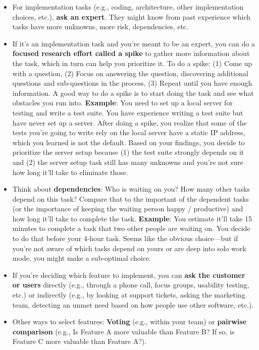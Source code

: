\begin{itemize}
    \item For implementation tasks (e.g., coding, architecture, other implementation choices, etc.), \textbf{ask an expert}. They might know from past experience which tasks have more unknowns, more risk, dependencies, etc.\\
    \item If it's an implementation task and you're meant to be an expert, you can do a \textbf{focused research effort called a spike}\marginpar{\spikeDef} to gather more information about the task, which in turn can help you prioritize it. To do a spike: (1) Come up with a question, (2) Focus on answering the question, discovering additional questions and sub-questions in the process, (3) Repeat until you have enough information. A good way to do a spike is to start doing the task and see what obstacles you run into. \textbf{Example}: You need to set up a local server for testing and write a test suite. You have experience writing a test suite but have never set up a server. After doing a spike, you realize that some of the tests you're going to write rely on the local server have a static IP address, which you learned is not the default. Based on your findings, you decide to prioritize the server setup because (1) the test suite strongly depends on it and (2) the server setup task still has many unknowns and you're not sure how long it'll take to eliminate those. \\
    \item Think about \textbf{dependencies}: Who is waiting on you? How many other tasks depend on this task? Compare that to the important of the dependent tasks (or the importance of keeping the waiting person happy / productive) and how long it'll take to complete the task. \textbf{Example}: You estimate it'll take 15 minutes to complete a task that two other people are waiting on. You decide to do that before your 4-hour task. Seems like the obvious choice---but if you're not aware of which tasks depend on yours or are deep into solo work mode, you might make a sub-optimal choice.\\
    \item If you're deciding which feature to implement, you can \textbf{ask the customer or users} directly (e.g., through a phone call, focus groups\marginpar{\focusGroupDef\margindivider}, usability testing\marginpar{\usabilityTestingDef\margindivider}\marginpar{\estimationDef\margindivider}\marginpar{\storyPointsDef}, etc.) or indirectly (e.g., by looking at support tickets, asking the marketing team, detecting an unmet need based on how people use other software, etc.).\\
    \item Other ways to select features: \textbf{Voting} (e.g., within your team) or \textbf{pairwise comparison} (e.g., Is Feature A more valuable than Feature B? If so, is Feature C more valuable than Feature A?).\\
\end{itemize}
